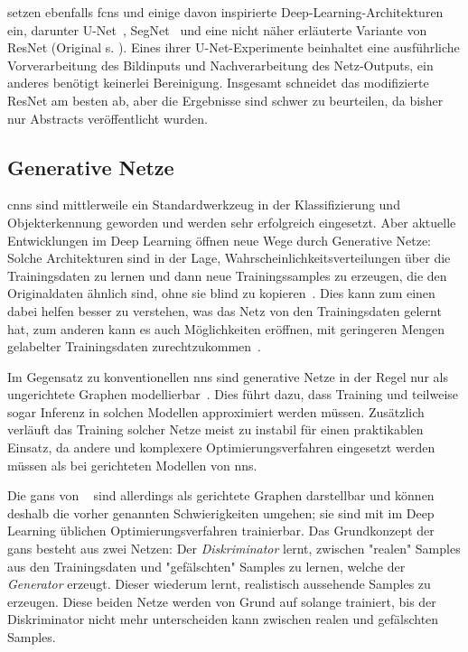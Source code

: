 \citeauthor{Wang.2018c} \cite{Wang.2018d,Wang.2018b,Wang.2018,Wang.2018c} setzen ebenfalls \glspl{fcn} und einige davon inspirierte Deep-Learning-Architekturen ein, darunter U-Net~\cite{Ronneberger.2015}, SegNet~\cite{Badrinarayanan.2017} und eine nicht näher erläuterte Variante von ResNet (Original s. \cite{He.2016}).
Eines ihrer U-Net-Experimente beinhaltet eine ausführliche Vorverarbeitung des Bildinputs und Nachverarbeitung des Netz-Outputs, ein anderes benötigt keinerlei Bereinigung.
Insgesamt schneidet das modifizierte ResNet am besten ab, aber die Ergebnisse sind schwer zu beurteilen, da bisher nur Abstracts veröffentlicht wurden.



\subsection{Generative Netze}

\glspl{cnn} sind mittlerweile ein Standardwerkzeug in der Klassifizierung und Objekterkennung geworden und werden sehr erfolgreich eingesetzt.
Aber aktuelle Entwicklungen im Deep Learning öffnen neue Wege durch Generative Netze:
Solche Architekturen sind in der Lage, Wahrscheinlichkeitsverteilungen über die Trainingsdaten zu lernen und dann neue Trainingssamples zu erzeugen, die den Originaldaten ähnlich sind, ohne sie blind zu kopieren~\cite{Goodfellow.2016}.
Dies kann zum einen dabei helfen besser zu verstehen, was das Netz von den Trainingsdaten gelernt hat, zum anderen kann es auch Möglichkeiten eröffnen, mit geringeren Mengen gelabelter Trainingsdaten zurechtzukommen~\cite{Kingma.2014}.

Im Gegensatz zu konventionellen \glspl{nn} sind generative Netze in der Regel nur als ungerichtete Graphen modellierbar~\cite{Goodfellow.2016}.
Dies führt dazu, dass Training und teilweise sogar Inferenz in solchen Modellen approximiert werden müssen.
Zusätzlich verläuft das Training solcher Netze meist zu instabil für einen praktikablen Einsatz, da andere und komplexere Optimierungsverfahren eingesetzt werden müssen als bei gerichteten Modellen von \glspl{nn}.

Die \glspl{gan} von \citeauthor{Goodfellow.2014}~\cite{Goodfellow.2014} sind allerdings als gerichtete Graphen darstellbar und können deshalb die vorher genannten Schwierigkeiten umgehen; sie sind mit im Deep Learning üblichen Optimierungsverfahren trainierbar.
Das Grundkonzept der \glspl{gan} besteht aus zwei Netzen:
Der \emph{Diskriminator} lernt, zwischen "realen" Samples aus den Trainingsdaten und "gefälschten" Samples zu lernen, welche der \emph{Generator} erzeugt.
Dieser wiederum lernt, realistisch aussehende Samples zu erzeugen.
Diese beiden Netze werden von Grund auf solange trainiert, bis der Diskriminator nicht mehr unterscheiden kann zwischen realen und gefälschten Samples.

